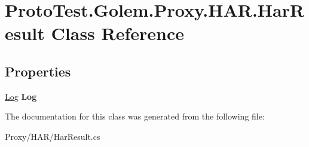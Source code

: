 \hypertarget{class_proto_test_1_1_golem_1_1_proxy_1_1_h_a_r_1_1_har_result}{\section{Proto\-Test.\-Golem.\-Proxy.\-H\-A\-R.\-Har\-Result Class Reference}
\label{class_proto_test_1_1_golem_1_1_proxy_1_1_h_a_r_1_1_har_result}
}
\subsection*{Properties}
\begin{DoxyCompactItemize}
\item 
\hypertarget{class_proto_test_1_1_golem_1_1_proxy_1_1_h_a_r_1_1_har_result_aae8ca1f15fe1e06c6ca049af8c1352ac}{\hyperlink{class_proto_test_1_1_golem_1_1_proxy_1_1_h_a_r_1_1_log}{Log} {\bfseries Log}}\label{class_proto_test_1_1_golem_1_1_proxy_1_1_h_a_r_1_1_har_result_aae8ca1f15fe1e06c6ca049af8c1352ac}

\end{DoxyCompactItemize}


The documentation for this class was generated from the following file\-:\begin{DoxyCompactItemize}
\item 
Proxy/\-H\-A\-R/Har\-Result.\-cs\end{DoxyCompactItemize}
